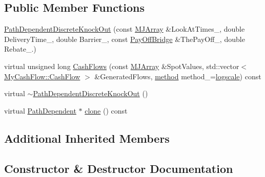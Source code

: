 \subsection*{Public Member Functions}
\begin{DoxyCompactItemize}
\item 
\hyperlink{classPathDependentDiscreteKnockOut_ab2d3c9b52dcc5716fd2548cfdf2ccbcd}{Path\+Dependent\+Discrete\+Knock\+Out} (const \hyperlink{classMJArray}{M\+J\+Array} \&Look\+At\+Times\+\_\+, double Delivery\+Time\+\_\+, double Barrier\+\_\+, const \hyperlink{classPayOffBridge}{Pay\+Off\+Bridge} \&The\+Pay\+Off\+\_\+, double Rebate\+\_.)
\item 
virtual unsigned long \hyperlink{classPathDependentDiscreteKnockOut_a7417c5e52e5f9140f1616fd5019a9eb3}{Cash\+Flows} (const \hyperlink{classMJArray}{M\+J\+Array} \&Spot\+Values, std\+::vector$<$ \hyperlink{classMyCashFlow_1_1CashFlow}{My\+Cash\+Flow\+::\+Cash\+Flow} $>$ \&Generated\+Flows, \hyperlink{PathDependent_8h_abed946c62f140eb7ff2ac742e6ad9497}{method} method\+\_\+=\hyperlink{PathDependent_8h_abed946c62f140eb7ff2ac742e6ad9497a064d3d3358889658ce07fe9f3191d1fd}{logscale}) const
\item 
virtual \hyperlink{classPathDependentDiscreteKnockOut_a9d72012bdfff7b91e9446ede2faeab27}{$\sim$\+Path\+Dependent\+Discrete\+Knock\+Out} ()
\item 
virtual \hyperlink{classPathDependent}{Path\+Dependent} $\ast$ \hyperlink{classPathDependentDiscreteKnockOut_a5e3b89d4d9eabff48ca28f84c3625151}{clone} () const
\end{DoxyCompactItemize}
\subsection*{Additional Inherited Members}


\subsection{Constructor \& Destructor Documentation}
\hypertarget{classPathDependentDiscreteKnockOut_ab2d3c9b52dcc5716fd2548cfdf2ccbcd}{}\label{classPathDependentDiscreteKnockOut_ab2d3c9b52dcc5716fd2548cfdf2ccbcd} 
